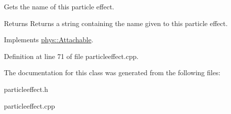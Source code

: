 Gets the name of this particle effect. 

\begin{DoxyReturn}{Returns}
Returns a string containing the name given to this particle effect. 
\end{DoxyReturn}


Implements \hyperlink{classphys_1_1Attachable_a0a07d727fa2630dc3550fd991ca28256}{phys::Attachable}.



Definition at line 71 of file particleeffect.cpp.



The documentation for this class was generated from the following files:\begin{DoxyCompactItemize}
\item 
particleeffect.h\item 
particleeffect.cpp\end{DoxyCompactItemize}
